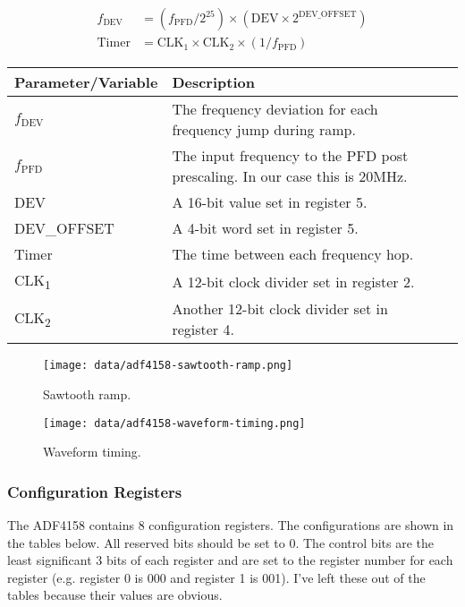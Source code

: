 \documentclass{default}
\begin{document}
\begin{align}
  f_{\text{DEV}} &= \left(f_{\text{PFD}}/2^{25}\right) \times \left(\text{DEV}\times
                   2^{\text{DEV\_OFFSET}}\right) \label{eq:adf4158-waveform} \\
  \text{Timer} &= \text{CLK}_1 \times \text{CLK}_2 \times \left(1/f_{\text{PFD}}\right) \nonumber
\end{align}

\label{tab:adf4158-waveform-equation-vars}
\begin{tabularx}{\textwidth}{l X>{\raggedright\arraybackslash}X}
  \toprule
  \textbf{Parameter/Variable} & \textbf{Description} \\
  \midrule
  \endhead

  $f_{\text{DEV}}$ & The frequency deviation for each frequency jump during ramp. \\
  $f_{\text{PFD}}$ & The input frequency to the PFD post prescaling. In our case this is 20MHz. \\
  DEV & A 16-bit value set in register 5. \\
  DEV\_OFFSET & A 4-bit word set in register 5. \\
  Timer & The time between each frequency hop. \\
  CLK\textsubscript{1} & A 12-bit clock divider set in register 2. \\
  CLK\textsubscript{2} & Another 12-bit clock divider set in register 4. \\

  \bottomrule
\end{tabularx}

\begin{figure}[h]
  \centering
  \texttt{[image: data/adf4158-sawtooth-ramp.png]}
  \caption{Sawtooth ramp.}
  \label{fig:adf4158-sawtooth-ramp}\end{figure}

\begin{figure}[h]
  \centering
  \texttt{[image: data/adf4158-waveform-timing.png]}
  \caption{Waveform timing.}
  \label{fig:adf4158-waveform-timing}\end{figure}

\subsubsection{Configuration Registers}
\label{sec:adf4158-config-regs}

The ADF4158 contains 8 configuration registers. The configurations are shown in the tables
below. All reserved bits should be set to 0. The control bits are the least significant 3 bits of
each register and are set to the register number for each register (e.g. register 0 is 000 and
register 1 is 001). I've left these out of the tables because their values are obvious.
\end{document}
